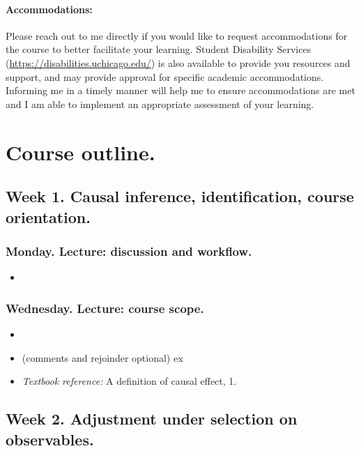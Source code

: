 \documentclass[letterpaper, 12pt, parskip=full,DIV=10]{scrartcl}
\begin{document}
\paragraph{Accommodations:} 
Please reach out to me directly if you would like to request accommodations for the course to better facilitate your learning. 
Student Disability Services (\url{https://disabilities.uchicago.edu/}) is also available to provide you resources and support, and may provide approval for specific academic accommodations. 
Informing me in a timely manner will help me to ensure accommodations are met and I am able to implement an appropriate assessment of your learning. 

\section*{Course outline.}

\subsection*{Week 1. Causal inference, identification, course orientation.}

\subsubsection*{Monday. Lecture: discussion and workflow.}
\begin{itemize}
\item {}
\end{itemize}

\subsubsection*{Wednesday. Lecture: course scope.}
\begin{itemize}
\item {}
\item {}
(comments and rejoinder optional) ex
\item \textit{Textbook reference:}  A definition of causal effect, 1. 
\end{itemize}

\subsection*{Week 2. Adjustment under selection on observables.}
\end{document}
